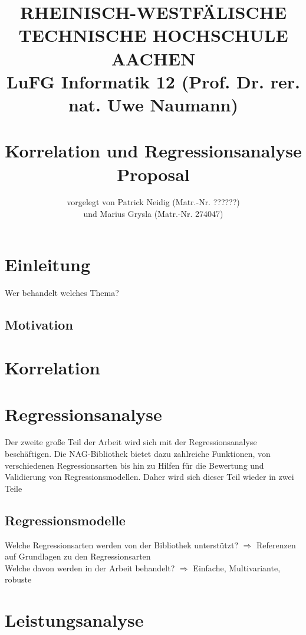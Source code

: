 \documentclass{article}
\title{
{\bf \scriptsize RHEINISCH-WESTF\"ALISCHE TECHNISCHE HOCHSCHULE AACHEN \\
LuFG Informatik 12 (Prof. Dr. rer. nat. Uwe Naumann)}
\vspace{.5cm} \\
\epsfig{file=figures/STCE_Logo_WWW.eps,width=.7\textwidth}
\vspace{1cm} \\
{\bf \Large Korrelation und Regressionsanalyse} \\
{\large Proposal} 
}
\author{vorgelegt von Patrick Neidig (Matr.-Nr. ??????)\\
	und Marius Grysla (Matr.-Nr. 274047)}
\begin{document}


\pagestyle{headings}

\maketitle


\newpage

\section{Einleitung}
Wer behandelt welches Thema?

\subsection{Motivation}

\section{Korrelation}

\section{Regressionsanalyse}

Der zweite große Teil der Arbeit wird sich mit der Regressionsanalyse beschäftigen.
Die NAG-Bibliothek bietet dazu zahlreiche Funktionen, von verschiedenen Regressionsarten bis hin zu Hilfen für die Bewertung und Validierung von Regressionsmodellen.
Daher wird sich dieser Teil wieder in zwei Teile 

\subsection{Regressionsmodelle}
Welche Regressionsarten werden von der Bibliothek unterstützt? $\Rightarrow$ Referenzen auf Grundlagen zu den Regressionsarten\\
Welche davon werden in der Arbeit behandelt? $\Rightarrow$ Einfache, Multivariante, robuste


\section{Leistungsanalyse}
\end{document}
